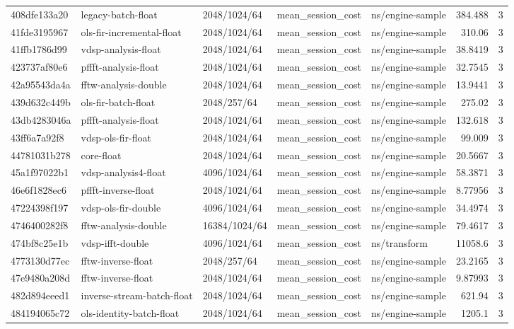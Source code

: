 \begin{longtable}{lllllrr}
408dfe133a20 & legacy-batch-float & 2048/1024/64 & mean\_session\_cost & ns/engine-sample & 384.488 & 3 \\
41fde3195967 & ols-fir-incremental-float & 2048/1024/64 & mean\_session\_cost & ns/engine-sample & 310.06 & 3 \\
41ffb1786d99 & vdsp-analysis-float & 2048/1024/64 & mean\_session\_cost & ns/engine-sample & 38.8419 & 3 \\
423737af80e6 & pffft-analysis-float & 2048/1024/64 & mean\_session\_cost & ns/engine-sample & 32.7545 & 3 \\
42a95543da4a & fftw-analysis-double & 2048/1024/64 & mean\_session\_cost & ns/engine-sample & 13.9441 & 3 \\
439d632c449b & ols-fir-batch-float & 2048/257/64 & mean\_session\_cost & ns/engine-sample & 275.02 & 3 \\
43db4283046a & pffft-analysis-float & 2048/1024/64 & mean\_session\_cost & ns/engine-sample & 132.618 & 3 \\
43ff6a7a92f8 & vdsp-ols-fir-float & 2048/1024/64 & mean\_session\_cost & ns/engine-sample & 99.009 & 3 \\
44781031b278 & core-float & 2048/1024/64 & mean\_session\_cost & ns/engine-sample & 20.5667 & 3 \\
45a1f97022b1 & vdsp-analysis4-float & 4096/1024/64 & mean\_session\_cost & ns/engine-sample & 58.3871 & 3 \\
46e6f1828ec6 & pffft-inverse-float & 2048/1024/64 & mean\_session\_cost & ns/engine-sample & 8.77956 & 3 \\
47224398f197 & vdsp-ols-fir-double & 4096/1024/64 & mean\_session\_cost & ns/engine-sample & 34.4974 & 3 \\
4746400282f8 & fftw-analysis-double & 16384/1024/64 & mean\_session\_cost & ns/engine-sample & 79.4617 & 3 \\
474bf8c25e1b & vdsp-ifft-double & 4096/1024/64 & mean\_session\_cost & ns/transform & 11058.6 & 3 \\
4773130d77ec & fftw-inverse-float & 2048/257/64 & mean\_session\_cost & ns/engine-sample & 23.2165 & 3 \\
47e9480a208d & fftw-inverse-float & 2048/1024/64 & mean\_session\_cost & ns/engine-sample & 9.87993 & 3 \\
482d894eeed1 & inverse-stream-batch-float & 2048/1024/64 & mean\_session\_cost & ns/engine-sample & 621.94 & 3 \\
484194065c72 & ols-identity-batch-float & 2048/1024/64 & mean\_session\_cost & ns/engine-sample & 1205.1 & 3 \\

\end{longtable}
